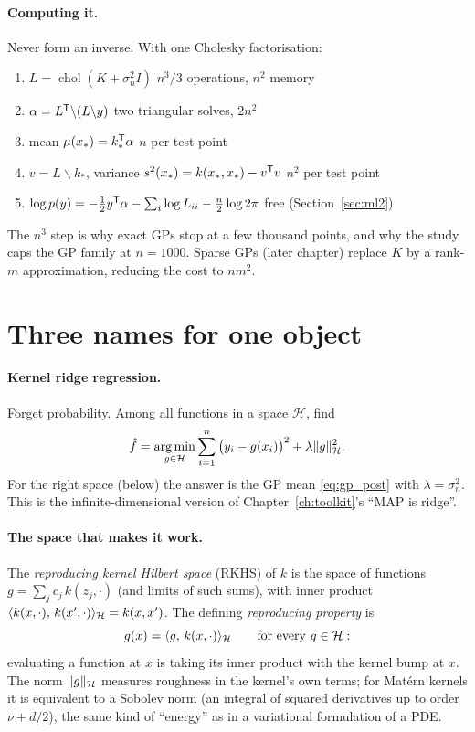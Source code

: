 \paragraph{Computing it.} Never form an inverse. With one Cholesky factorisation:
\begin{enumerate}[nosep]
  \item $L = \operatorname{chol}(K + \sigma_n^2 I)$ \hfill $n^3/3$ operations, $n^2$ memory
  \item $\alpha = L^{\mathsf{T}} \backslash (L \backslash y)$ \hfill two triangular solves, $2n^2$
  \item mean $\mu(x_*) = k_*^{\mathsf{T}}\alpha$ \hfill $n$ per test point
  \item $v = L \backslash k_*$, variance $s^2(x_*) = k(x_*,x_*) - v^{\mathsf{T}} v$ \hfill $n^2$ per test point
  \item $\log p(y) = -\tfrac12 y^{\mathsf{T}}\alpha - \sum_i \log L_{ii} - \tfrac n2 \log 2\pi$ \hfill free (Section~\ref{sec:ml2})
\end{enumerate}
The $n^3$ step is why exact GPs stop at a few thousand points, and why the study caps the GP family at $n = 1000$.
Sparse GPs (later chapter) replace $K$ by a rank-$m$ approximation, reducing the cost to $n m^2$.

\section{Three names for one object}
\label{sec:kriging}

\paragraph{Kernel ridge regression.} Forget probability. Among all functions in a space $\mathcal{H}$, find
\begin{equation}
  \hat f = \operatorname*{arg\,min}_{g \in \mathcal{H}} \sum_{i=1}^n \big(y_i - g(x_i)\big)^2 + \lambda \lVert g\rVert_{\mathcal{H}}^2 .
  \label{eq:krr}
\end{equation}
For the right space (below) the answer is the GP mean \eqref{eq:gp_post} with $\lambda = \sigma_n^2$. This is the
infinite-dimensional version of Chapter~\ref{ch:toolkit}'s ``MAP is ridge''.

\paragraph{The space that makes it work.} The \emph{reproducing kernel Hilbert space} (RKHS) of $k$ is the space of
functions $g = \sum_j c_j\, k(z_j, \cdot)$ (and limits of such sums), with inner product
$\langle k(x,\cdot),\, k(x',\cdot)\rangle_{\mathcal{H}} = k(x,x')$. The defining \emph{reproducing property} is
\begin{equation}
  g(x) = \langle g,\, k(x,\cdot)\rangle_{\mathcal{H}} \qquad\text{for every } g \in \mathcal{H}:
\end{equation}
evaluating a function at $x$ is taking its inner product with the kernel bump at $x$. The norm
$\lVert g\rVert_{\mathcal{H}}$ measures roughness in the kernel's own terms; for Mat\'ern kernels it is equivalent to a
Sobolev norm (an integral of squared derivatives up to order $\nu + d/2$), the same kind of ``energy'' as in a
variational formulation of a PDE.

